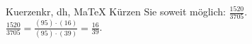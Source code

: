 \begin{MAufgabe}{Kuerzen}{kr, dh, MaTeX}
K\"urzen Sie soweit m\"oglich: $\frac{1520}{3705}$.\\ 
\ifLsg\MLoesung
\quad $\frac{1520}{3705}=\frac{(95)\cdot(16)}{(95)\cdot(39)}=\frac{16}{39}$.\else\relax\fi
 \end{MAufgabe}